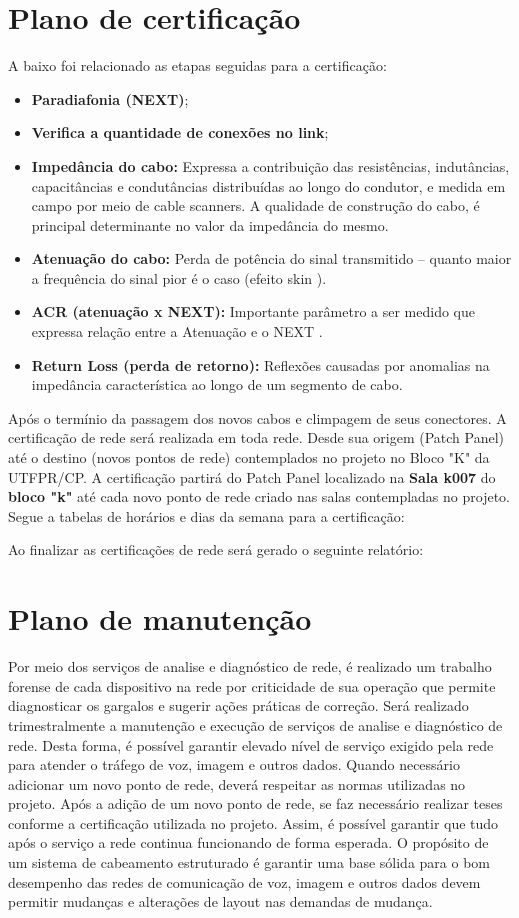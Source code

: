 \documentclass[	DIV=calc,%
							paper=a4,%
							fontsize=12pt,%
							onecolumn]{scrartcl}	 					%
\begin{document}
\section{Plano de certificação}
A baixo foi relacionado as etapas seguidas para a certificação:
\begin{itemize}
\item \textbf{Paradiafonia (NEXT)};
\item \textbf{Verifica a quantidade de conexões no link};
\item \textbf{Impedância do cabo:} Expressa a contribuição das resistências, indutâncias, capacitâncias e condutâncias distribuídas ao longo do condutor, e medida em campo por meio de cable scanners. A qualidade de construção do cabo, é principal determinante no valor da impedância do mesmo.
\item \textbf{Atenuação do cabo:} Perda de potência do sinal transmitido – quanto maior a frequência do sinal pior é o caso (efeito skin ).
\item \textbf{ACR (atenuação x NEXT):} Importante parâmetro a ser medido que expressa relação entre a Atenuação e o NEXT .
\item \textbf{Return Loss (perda de retorno):} Reflexões causadas por anomalias na impedância característica ao longo de um segmento de cabo.
\end{itemize}
Após o termínio da passagem dos novos cabos e climpagem de seus conectores. A certificação de rede será realizada em toda rede. Desde sua origem (Patch Panel) até o destino (novos pontos de rede) contemplados no projeto no Bloco "K" da UTFPR/CP. 
A certificação partirá do Patch Panel localizado na \textbf{Sala k007} do \textbf{bloco "k"} até cada novo ponto de rede criado nas salas contempladas no projeto. 
Segue a tabelas de horários e dias da semana para a certificação:



Ao finalizar as certificações de rede será gerado o seguinte relatório:

\section{Plano de manutenção}

Por meio dos serviços de analise e diagnóstico de rede, é realizado um trabalho forense de cada dispositivo na rede por criticidade de sua operação que permite diagnosticar os gargalos e sugerir ações práticas de correção.
Será realizado trimestralmente a manutenção e execução de serviços de analise e diagnóstico de rede. Desta forma, é possível garantir elevado nível de serviço exigido pela rede para atender o tráfego de voz, imagem e outros dados.
Quando necessário adicionar um novo ponto de rede, deverá respeitar as normas utilizadas no projeto. Após a adição de um novo ponto de rede, se faz necessário realizar teses conforme a certificação utilizada no projeto. Assim, é possível garantir que tudo após o serviço a rede continua funcionando de forma esperada.
O propósito de um sistema de cabeamento estruturado é garantir uma base sólida para o bom desempenho das redes de comunicação de voz, imagem e outros dados devem permitir mudanças e alterações de layout nas demandas de mudança.
\end{document}
